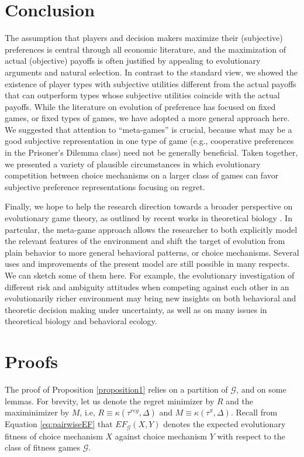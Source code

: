 \documentclass[fleqn,reqno,11pt]{article}
\begin{document}
\section{Conclusion} \label{sec:conclusion}


The assumption that players and decision makers maximize their (subjective) preferences is central through all economic literature, and the maximization of actual (objective) payoffs is often justified by appealing to evolutionary arguments and natural
selection. In contrast to the standard view, we showed the
existence of player types with subjective utilities different
from the actual payoffs that can outperform types whose
subjective utilities coincide with the actual payoffs.
While the literature on evolution of preference has focused
on fixed games, or fixed types of games, we have adopted a
more general approach here. We suggested that attention
to “meta-games” is crucial, because what may be a good
subjective representation in one type of game (e.g., cooperative preferences in the Prisoner’s Dilemma class) need not
be generally beneficial. Taken together, we presented a variety of plausible circumstances in which evolutionary competition between choice
mechanisms on a larger class of games can favor subjective
preference representations focusing on regret.

Finally, we hope to help the research direction towards a broader perspective on evolutionary game theory, as outlined by recent works in theoretical biology \citep[e.g.,][]{FawcettHamblin2013:Exposing-the-be}. In partcular, the meta-game approach allows the researcher to both explicitly model the relevant features of the environment and shift the target of evolution from plain behavior to more general behavioral patterns, or choice mechanisms.
Several uses and improvements of the present model are still possible in many respects. We can sketch some of them here. For example, the evolutionary investigation of different risk and ambiguity attitudes when competing against each other in an evolutionarily richer environment may bring new insights on both behavioral and theoretic decision making under uncertainty, as well as on many issues in theoretical biology and behavioral ecology.


\appendix


\section{Proofs}

The proof of Proposition \ref{proposition1} relies on a partition of $\mathcal{G}$,
and on some lemmas. For brevity, let us denote the regret minimizer
by $R$ and the maximinimizer by $M$, i.e, $R \equiv \kappa(\tau^{reg}, \Delta)$ and $M \equiv  \kappa(\tau^{\pi}, \Delta)$. Recall from Equation \ref{eq:pairwiseEF} that $EF_{\mathcal{G}}(X,Y)$ denotes the expected evolutionary fitness of choice mechanism $X$ against choice mechanism $Y$
with respect to the class of fitness games $\mathcal{G}$.
\end{document}
